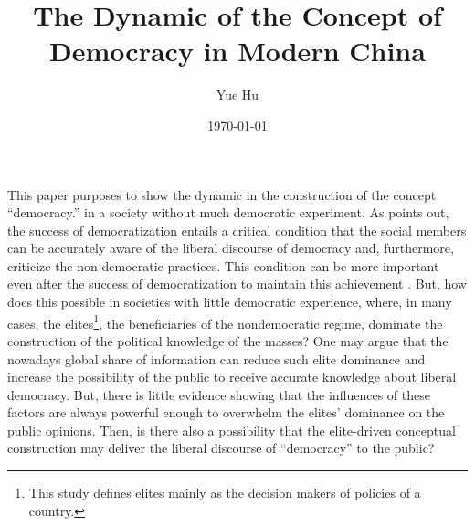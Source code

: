 \documentclass[abstracton,UTF8]{ctexart}
\author{Yue Hu}
\begin{document}
	\title{The Dynamic of the Concept of Democracy in Modern China}
	\date{\today}
	\maketitle
	
	\setlength{\parindent}{2em} %

This paper purposes to show the dynamic in the construction of the concept ``democracy.'' in a society without much democratic experiment. As \citet{Diamond2006} points out, the success of democratization entails a critical condition that the social members can be accurately aware of the liberal discourse of democracy and, furthermore, criticize the non-democratic practices. This condition can be more important even after the success of democratization to maintain this achievement \citep{Almond1989,Putnam1994}. But, how does this possible in societies with little democratic experience, where, in many cases, the elites\footnote{This study defines elites mainly as the decision makers of policies of a country.}, the beneficiaries of the nondemocratic regime, dominate the construction of the political knowledge of the masses? One may argue that the nowadays global share of information can reduce such elite dominance and increase the possibility of the public to receive accurate knowledge about liberal democracy. But, there is little evidence showing that the influences of these factors are always powerful enough to overwhelm the elites' dominance on the public opinions. Then, is there also a possibility that the elite-driven conceptual construction may deliver the liberal discourse of ``democracy'' to the public?  
\end{document}
